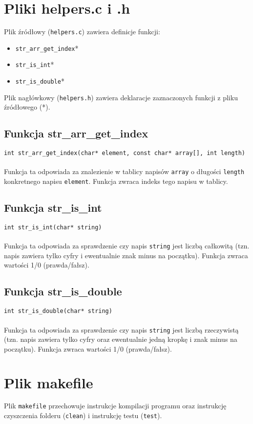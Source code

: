 \documentclass[11pt,a4paper]{report}
\begin{document}
    \section{Pliki helpers.c i .h}
    Plik źródłowy (\verb|helpers.c|) zawiera definicje funkcji:
    \begin{itemize}
        \item \verb|str_arr_get_index|*
        \item \verb|str_is_int|*
        \item \verb|str_is_double|*
    \end{itemize}
    Plik nagłówkowy (\verb|helpers.h|) zawiera deklaracje zaznaczonych funkcji z pliku źródłowego (*).\\
    \subsection{Funkcja str\_arr\_get\_index}
    \verb|int str_arr_get_index(char* element, const char* array[], int length)|\\
    \\
    Funkcja ta odpowiada za znalezienie w tablicy napisów \verb|array| o długości \verb|length| konkretnego napisu \verb|element|. Funkcja zwraca indeks tego napisu w tablicy.\\
    \subsection{Funkcja str\_is\_int}
    \verb|int str_is_int(char* string)|\\
    \\
    Funkcja ta odpowiada za sprawdzenie czy napis \verb|string| jest liczbą całkowitą (tzn. napis zawiera tylko cyfry i ewentualnie znak minus na początku). Funkcja zwraca wartości 1/0 (prawda/fałsz).\\
    \subsection{Funkcja str\_is\_double}
    \verb|int str_is_double(char* string)|\\
    \\
    Funkcja ta odpowiada za sprawdzenie czy napis \verb|string| jest liczbą rzeczywistą (tzn. napis zawiera tylko cyfry oraz ewentualnie jedną kropkę i znak minus na początku). Funkcja zwraca wartości 1/0 (prawda/fałsz).\\

    \newpage
    \section{Plik makefile}
    Plik \verb|makefile| przechowuje instrukcje kompilacji programu oraz instrukcję czyszczenia folderu (\verb|clean|) i instrukcję testu (\verb|test|).\\
\end{document}
